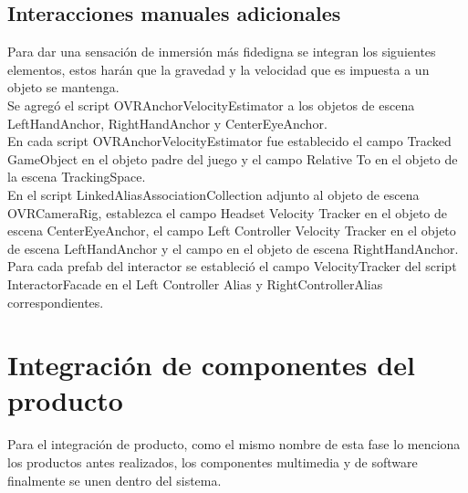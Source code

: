 \subsection{Interacciones manuales adicionales}

Para dar una sensación de inmersión más fidedigna se integran los siguientes elementos, estos harán que la gravedad y la velocidad que es impuesta a un objeto se mantenga.\\
Se agregó el script OVRAnchorVelocityEstimator a los objetos de escena LeftHandAnchor, RightHandAnchor y CenterEyeAnchor.\\
En cada script OVRAnchorVelocityEstimator fue establecido el campo Tracked GameObject en el objeto padre del juego y el campo Relative To en el objeto de la escena TrackingSpace.\\
En el script LinkedAliasAssociationCollection adjunto al objeto de escena OVRCameraRig, establezca el campo Headset Velocity Tracker en el objeto de escena CenterEyeAnchor, 
el campo Left Controller Velocity Tracker en el objeto de escena LeftHandAnchor y el campo en el objeto de escena RightHandAnchor.\\
Para cada prefab del interactor se estableci\'o el campo VelocityTracker del script InteractorFacade en el Left Controller Alias y RightControllerAlias correspondientes.

\section{Integración de componentes del producto}
Para el integración de producto, como el mismo nombre de esta fase lo menciona los productos antes realizados, los componentes multimedia y de software finalmente se unen 
dentro del sistema.\\
